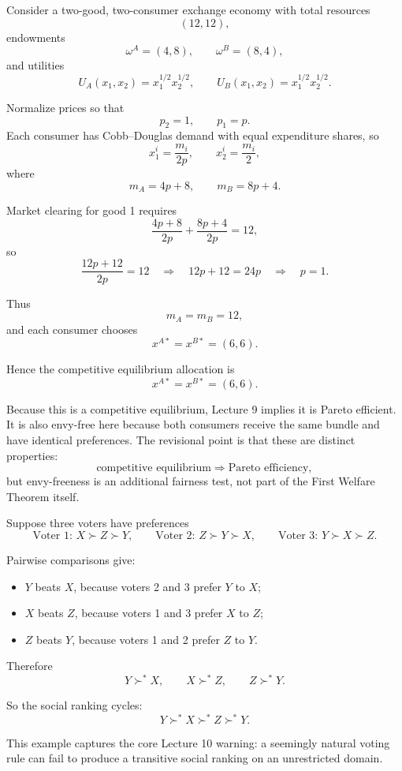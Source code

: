 \begin{examplebox}[title={Worked Review Example 3: Competitive equilibrium, efficiency, and fairness}]
Consider a two-good, two-consumer exchange economy with total resources
\[
(12,12),
\]
endowments
\[
\omega^A=(4,8),
\qquad
\omega^B=(8,4),
\]
and utilities
\[
U_A(x_1,x_2)=x_1^{1/2}x_2^{1/2},
\qquad
U_B(x_1,x_2)=x_1^{1/2}x_2^{1/2}.
\]

Normalize prices so that
\[
p_2=1,
\qquad
p_1=p.
\]
Each consumer has Cobb--Douglas demand with equal expenditure shares, so
\[
x_1^i=\frac{m_i}{2p},
\qquad
x_2^i=\frac{m_i}{2},
\]
where
\[
m_A=4p+8,
\qquad
m_B=8p+4.
\]

Market clearing for good 1 requires
\[
\frac{4p+8}{2p}+\frac{8p+4}{2p}=12,
\]
so
\[
\frac{12p+12}{2p}=12
\quad \Longrightarrow \quad
12p+12=24p
\quad \Longrightarrow \quad
p=1.
\]

Thus
\[
m_A=m_B=12,
\]
and each consumer chooses
\[
x^{A*}=x^{B*}=(6,6).
\]

Hence the competitive equilibrium allocation is
\[
\boxed{x^{A*}=x^{B*}=(6,6).}
\]

Because this is a competitive equilibrium, Lecture 9 implies it is Pareto efficient. It is also envy-free here because both consumers receive the same bundle and have identical preferences. The revisional point is that these are distinct properties:
\[
\text{competitive equilibrium} \Rightarrow \text{Pareto efficiency},
\]
but envy-freeness is an additional fairness test, not part of the First Welfare Theorem itself.
\end{examplebox}

\begin{examplebox}[title={Worked Review Example 4: Condorcet cycles under pairwise majority voting}]
Suppose three voters have preferences
\[
\text{Voter 1: } X \succ Z \succ Y,
\qquad
\text{Voter 2: } Z \succ Y \succ X,
\qquad
\text{Voter 3: } Y \succ X \succ Z.
\]

Pairwise comparisons give:
\begin{itemize}
    \item \(Y\) beats \(X\), because voters 2 and 3 prefer \(Y\) to \(X\);
    \item \(X\) beats \(Z\), because voters 1 and 3 prefer \(X\) to \(Z\);
    \item \(Z\) beats \(Y\), because voters 1 and 2 prefer \(Z\) to \(Y\).
\end{itemize}

Therefore
\[
Y \succ^* X,
\qquad
X \succ^* Z,
\qquad
Z \succ^* Y.
\]

So the social ranking cycles:
\[
\boxed{Y \succ^* X \succ^* Z \succ^* Y.}
\]

This example captures the core Lecture 10 warning: a seemingly natural voting rule can fail to produce a transitive social ranking on an unrestricted domain.
\end{examplebox}

